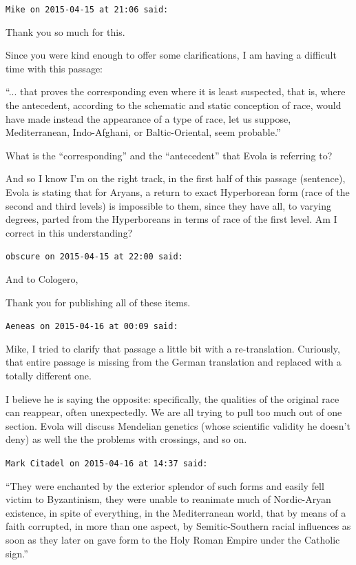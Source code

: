 \begin{footnotesize}
\begin{sffamily}
\hfill

\texttt{Mike on 2015-04-15 at 21:06 said:}

Thank you so much for this.

Since you were kind enough to offer some clarifications, I am having a difficult time with this passage:

``... that proves the corresponding even where it is least suspected, that is, where the antecedent, according to the schematic and static conception of race, would have made instead the appearance of a type of race, let us suppose, Mediterranean, Indo-Afghani, or Baltic-Oriental, seem probable.''

What is the ``corresponding'' and the ``antecedent'' that Evola is referring to?

And so I know I'm on the right track, in the first half of this passage (sentence), Evola is stating that for Aryans, a return to exact Hyperborean form (race of the second and third levels) is impossible to them, since they have all, to varying degrees, parted from the Hyperboreans in terms of race of the first level. Am I correct in this understanding?

\hfill

\texttt{obscure on 2015-04-15 at 22:00 said:}

And to Cologero,

Thank you for publishing all of these items.

\hfill

\texttt{Aeneas on 2015-04-16 at 00:09 said:}

Mike, I tried to clarify that passage a little bit with a re-translation. Curiously, that entire passage is missing from the German translation and replaced with a totally different one.

I believe he is saying the opposite: specifically, the qualities of the original race can reappear, often unexpectedly. We are all trying to pull too much out of one section. Evola will discuss Mendelian genetics (whose scientific validity he doesn't deny) as well the the problems with crossings, and so on.

\hfill

\texttt{Mark Citadel on 2015-04-16 at 14:37 said:}

``They were enchanted by the exterior splendor of such forms and easily fell victim to Byzantinism, they were unable to reanimate much of Nordic-Aryan existence, in spite of everything, in the Mediterranean world, that by means of a faith corrupted, in more than one aspect, by Semitic-Southern racial influences as soon as they later on gave form to the Holy Roman Empire under the Catholic sign.''


\end{sffamily}
\end{footnotesize}
